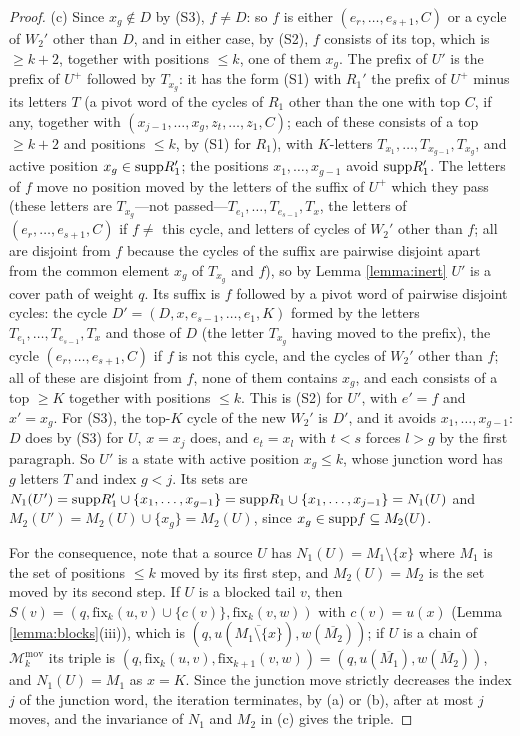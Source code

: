 \documentclass{amsart}
\theoremstyle{definition}
\theoremstyle{remark}
\numberwithin{equation}{section}
\newcommand{\fx}{\mathrm{fix}}
\begin{document}
\begin{proof}
(c) Since $x_g\notin D$ by (S3), $f\neq D$: so $f$ is either $(e_r,\ldots,e_{s+1},C)$ or a cycle of $W_2'$ other than $D$, and in either case, by (S2), $f$ consists of its top, which is $\geq k+2$, together with positions $\leq k$, one of them $x_g$. The prefix of $U'$ is the prefix of $U^+$ followed by $T_{x_g}$: it has the form (S1) with $R_1'$ the prefix of $U^+$ minus its letters $T$ (a pivot word of the cycles of $R_1$ other than the one with top $C$, if any, together with $(x_{j-1},\ldots,x_g,z_t,\ldots,z_1,C)$; each of these consists of a top $\geq k+2$ and positions $\leq k$, by (S1) for $R_1$), with $K$-letters $T_{x_1},\ldots,T_{x_{g-1}},T_{x_g}$, and active position $x_g\in\mathrm{supp} R_1'$; the positions $x_1,\ldots,x_{g-1}$ avoid $\mathrm{supp} R_1'$. The letters of $f$ move no position moved by the letters of the suffix of $U^+$ which they pass (these letters are $T_{x_g}$---not passed---$T_{e_1},\ldots,T_{e_{s-1}},T_x$, the letters of $(e_r,\ldots,e_{s+1},C)$ if $f\neq$ this cycle, and letters of cycles of $W_2'$ other than $f$; all are disjoint from $f$ because the cycles of the suffix are pairwise disjoint apart from the common element $x_g$ of $T_{x_g}$ and $f$), so by Lemma \ref{lemma:inert} $U'$ is a cover path of weight $q$. Its suffix is $f$ followed by a pivot word of pairwise disjoint cycles: the cycle $D'=(D,x,e_{s-1},\ldots,e_1,K)$ formed by the letters $T_{e_1},\ldots,T_{e_{s-1}},T_x$ and those of $D$ (the letter $T_{x_g}$ having moved to the prefix), the cycle $(e_r,\ldots,e_{s+1},C)$ if $f$ is not this cycle, and the cycles of $W_2'$ other than $f$; all of these are disjoint from $f$, none of them contains $x_g$, and each consists of a top $\geq K$ together with positions $\leq k$. This is (S2) for $U'$, with $e'=f$ and $x'=x_g$. For (S3), the top-$K$ cycle of the new $W_2'$ is $D'$, and it avoids $x_1,\ldots,x_{g-1}$: $D$ does by (S3) for $U$, $x=x_j$ does, and $e_t=x_l$ with $t<s$ forces $l>g$ by the first paragraph. So $U'$ is a state with active position $x_g\leq k$, whose junction word has $g$ letters $T$ and index $g<j$. Its sets are $N_1(U')=\mathrm{supp} R_1'\cup\{x_1,\ldots,x_{g-1}\}=\mathrm{supp} R_1\cup\{x_1,\ldots,x_{j-1}\}=N_1(U)$ and $M_2(U')=M_2(U)\cup\{x_g\}=M_2(U)$, since $x_g\in\mathrm{supp} f\subseteq M_2(U)$.

For the consequence, note that a source $U$ has $N_1(U)=M_1\setminus\{x\}$ where $M_1$ is the set of positions $\leq k$ moved by its first step, and $M_2(U)=M_2$ is the set moved by its second step. If $U$ is a blocked tail $v$, then $S(v)=(q,\fx_k(u,v)\cup\{c(v)\},\fx_k(v,w))$ with $c(v)=u(x)$ (Lemma \ref{lemma:blocks}(iii)), which is $(q,u(\overline{M_1\setminus\{x\}}),w(\overline{M_2}))$; if $U$ is a chain of $\mathcal M_k^{\mathrm{mov}}$ its triple is $(q,\fx_k(u,v),\fx_{k+1}(v,w))=(q,u(\overline{M_1}),w(\overline{M_2}))$, and $N_1(U)=M_1$ as $x=K$. Since the junction move strictly decreases the index $j$ of the junction word, the iteration terminates, by (a) or (b), after at most $j$ moves, and the invariance of $N_1$ and $M_2$ in (c) gives the triple.
\end{proof}
\end{document}
